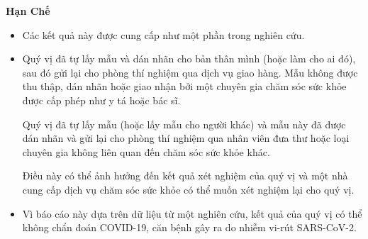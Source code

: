 \documentclass[10pt]{article}
\begin{document}
\textbf{Hạn Chế}

\begin{itemize}

\item

  Các kết quả này được cung cấp như một phần trong nghiên cứu.

\item
  Quý vị đã tự lấy mẫu và dán nhãn cho bản thân mình (hoặc làm cho ai đó), sau
  đó gửi lại cho phòng thí nghiệm qua dịch vụ giao hàng. Mẫu không được thu
  thập, dán nhãn hoặc giao nhận bởi một chuyên gia chăm sóc sức khỏe được cấp
  phép như y tá hoặc bác sĩ.

  Quý vị đã tự lấy mẫu (hoặc lấy mẫu cho người khác) và mẫu này đã được dán nhãn
  và gửi lại cho phòng thí nghiệm qua nhân viên đưa thư hoặc loại chuyên gia
  không liên quan đến chăm sóc sức khỏe khác.



  Điều này có thể ảnh hưởng đến kết quả xét nghiệm của quý vị và một nhà cung
  cấp dịch vụ chăm sóc sức khỏe có thể muốn xét nghiệm lại cho quý vị.

\item

  Vì báo cáo này dựa trên dữ liệu từ một nghiên cứu, kết quả của quý vị có thể
  không chẩn đoán COVID-19, căn bệnh gây ra do nhiễm vi-rút SARS-CoV-2.

\end{itemize}
\end{document}
